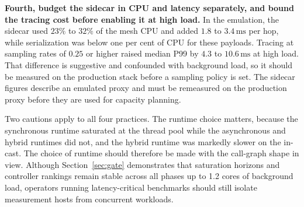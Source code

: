 \textbf{Fourth, budget the sidecar in CPU and latency separately, and bound the tracing cost before enabling it at high load.} In the emulation, the sidecar used $23\%$ to $32\%$ of the mesh CPU and added $1.8$ to $3.4\,\mathrm{ms}$ per hop, while serialization was below one per cent of CPU for these payloads. Tracing at sampling rates of $0.25$ or higher raised median P99 by $4.3$ to $10.6\,\mathrm{ms}$ at high load. That difference is suggestive and confounded with background load, so it should be measured on the production stack before a sampling policy is set. The sidecar figures describe an emulated proxy and must be remeasured on the production proxy before they are used for capacity planning.

Two cautions apply to all four practices. The runtime choice matters, because the synchronous runtime saturated at the thread pool while the asynchronous and hybrid runtimes did not, and the hybrid runtime was markedly slower on the in-cast. The choice of runtime should therefore be made with the call-graph shape in view. Although Section~\ref{sec:gate} demonstrates that saturation horizons and controller rankings remain stable across all phases up to 1.2 cores of background load, operators running latency-critical benchmarks should still isolate measurement hosts from concurrent workloads.
